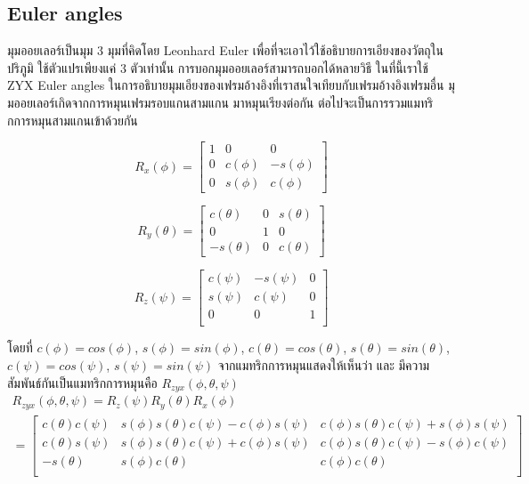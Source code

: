\clearpage
\subsection{Euler angles}
มุมออยเลอร์เป็นมุม 3 มุมที่คิดโดย Leonhard Euler เพื่อที่จะเอาไว้ใช้อธิบายการเอียงของวัตถุในปริภูมิ
ใช้ตัวแปรเพียงแค่ 3 ตัวเท่านั้น การบอกมุมออยเลอร์สามารถบอกได้หลายวิธี ในที่นี้เราใช้ ZYX Euler angles
ในการอธิบายมุมเอียงของเฟรมอ้างอิงที่เราสนใจเทียบกับเฟรมอ้างอิงเฟรมอื่น มุมออยเลอร์เกิดจากการหมุนเฟรมรอบแกนสามแกน
มาหมุนเรียงต่อกัน ต่อไปจะเป็นการรวมแมทริกการหมุนสามแกนเข้าด้วยกัน

\begin{equation}
	{R_{x}(\phi) = \begin{bmatrix}
		1 & 0 & 0 \\
		0 & c(\phi) & -s(\phi) \\
		0 & s(\phi) & c(\phi)
		\end{bmatrix}}
	\label{equ:rotation_matrix_x}
\end{equation}

\begin{equation}
	{R_{y}(\theta) = \begin{bmatrix}
		c(\theta) & 0 & s(\theta) \\
		0 & 1 & 0 \\
		-s(\theta) & 0 & c(\theta)
		\end{bmatrix}}
	\label{equ:rotation_matrix_y}
\end{equation}

\begin{equation}
	{R_{z}(\psi) = \begin{bmatrix}
		c(\psi) & -s(\psi) & 0 \\
		s(\psi) & c(\psi) & 0 \\
		0 & 0 & 1 \\
		\end{bmatrix}}
	\label{equ:rotation_matrix_z}
\end{equation}

โดยที่ $c(\phi) = cos(\phi)$, $s(\phi) = sin(\phi)$, $c(\theta) = cos(\theta)$, $s(\theta) = sin(\theta)$, $c(\psi) = cos(\psi)$, $s(\psi) = sin(\psi)$
จากแมทริกการหมุนแสดงให้เห็นว่า  และ 
มีความสัมพันธ์กันเป็นแมทริกการหมุนคือ $R_{zyx}(\phi,\theta,\psi)$
\begin{equation}
	\begin{array}{c}
		{R_{zyx}(\phi,\theta,\psi) = R_{z}(\psi)R_{y}(\theta)R_{x}(\phi)}\\
		{= \begin{bmatrix}
		c(\theta)c(\psi) & s(\phi)s(\theta)c(\psi)-c(\phi)s(\psi) & c(\phi)s(\theta)c(\psi)+s(\phi)s(\psi) \\
		c(\theta)s(\psi) & s(\phi)s(\theta)c(\psi)+c(\phi)s(\psi) & c(\phi)s(\theta)c(\psi)-s(\phi)c(\psi) \\
		-s(\theta)       & s(\phi)c(\theta)                       & c(\phi)c(\theta)                       \\
		\end{bmatrix}}
		\label{equ:rotation_matrix_zyx}
	\end{array}
\end{equation}

